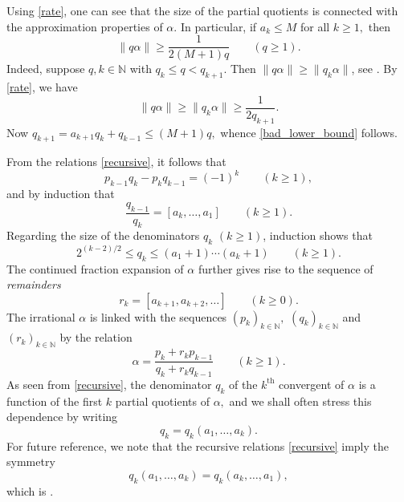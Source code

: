 \documentclass[12pt, reqno]{amsart}
\theoremstyle{definition}
\theoremstyle{remark}
\numberwithin{equation}{section}
\def\alp{{\alpha}} \def\bfalp{{\boldsymbol \alpha}}
\def\ls{\leqslant} \def\gs{\geqslant}
\def\geq{\geqslant}
\def \bN {\mathbb N}
\begin{document}
	Using \eqref{rate}, one can see that the size of the partial quotients is connected with the approximation properties of $\alp.$ In particular, if $a_k \ls M$ for all $k\gs 1,$ then 
	\begin{equation} \label{bad_lower_bound}
		\| q\alp\| \gs \frac{1}{2(M+1)q} \qquad (q\gs 1). 
	\end{equation}
	Indeed, suppose $q, k \in \bN$ with $q_k \ls q < q_{k+1}.$ Then $\|q\alp\| \gs \|q_k\alp\|$, see \cite[Chapter II.2]{RS1992}. By \eqref{rate}, we have
	\[ 
	\|q\alp\| \gs \|q_k \alp\| \gs \frac{1}{2q_{k+1}}.
	\]
	Now $q_{k+1} = a_{k+1}q_{k}+q_{k-1} \ls (M+1)q,$ whence \eqref{bad_lower_bound} follows. 
	
	From the relations \eqref{recursive}, it follows that
	\begin{equation} \label{pkqk}
		p_{k-1}q_k - p_k q_{k-1} = (-1)^{k} \qquad (k\gs 1),
	\end{equation}
	and by induction that
	\begin{equation} \label{cf_inverse}
		\frac{q_{k-1}}{q_k}=[a_k,\dots,a_1] \qquad (k\gs 1).
	\end{equation}
	Regarding the size of the denominators $q_k \,\,  (k\gs 1)$, induction shows that 
	\begin{equation} \label{q_k_size}
		2^{(k-2)/2} \ls q_k \ls (a_1 + 1)\cdots (a_k +1)  \qquad (k\gs 1).    
	\end{equation}
	The continued fraction expansion of $\alpha$ further gives rise to the sequence of {\it remainders} 
	\begin{equation} \label{rk_def}
		r_k = [a_{k+1}, a_{k+2}, \dots] \qquad (k\gs 0).  
	\end{equation} 
	The irrational $\alp$ is linked with the sequences  $(p_k)_{k\in\bN},$ $(q_k)_{k\in\bN}$ and $(r_k)_{k\in\bN}$ by the relation
	\begin{equation} \label{relation_remainders}
		\alp = \frac{p_k + r_{k}p_{k-1}}{q_k + r_{k}q_{k-1}} \qquad (k\geq 1).
	\end{equation}
	As seen from \eqref{recursive}, the denominator $q_k$ of the $k^{\mathrm{th}}$ convergent of $\alp$ is a function of the first $k$ partial quotients of $\alpha,$ and we shall often stress this dependence by writing 
	\[ 
	q_k = q_k(a_1,\ldots,a_k).
	\]
	For future reference, we note that the recursive relations \eqref{recursive} imply the symmetry
	\begin{equation} \label{q_k_inverse}
		q_k(a_1,\ldots,a_k)=q_k(a_k,\ldots,a_1),
	\end{equation}
	which is \cite[Equation (2)]{QR2003}.
	
\end{document}

